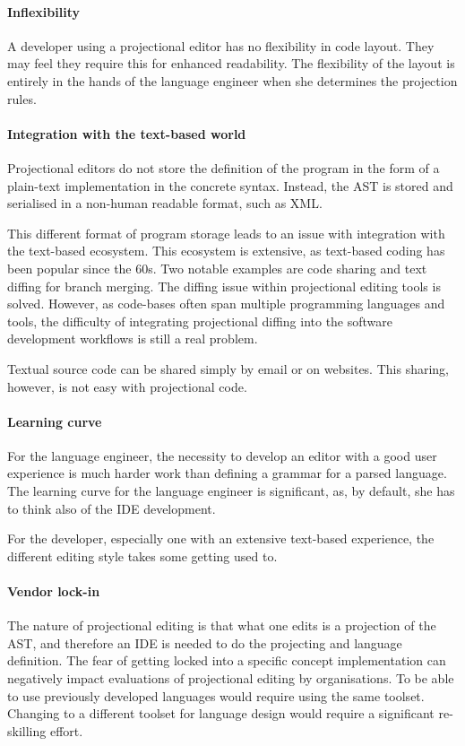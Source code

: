 \paragraph{Inflexibility} A developer using a projectional editor has no flexibility in code layout. They may feel they require this for enhanced readability.
The flexibility of the layout is entirely in the hands of the language engineer when she determines the projection rules.

\paragraph{Integration with the text-based world} Projectional editors do not store the definition of the program in the form of a plain-text implementation in the concrete syntax.
Instead, the AST is stored and serialised in a non-human readable format, such as XML.

This different format of program storage leads to an issue with integration with the text-based ecosystem.
This ecosystem is extensive, as text-based coding has been popular since the 60s.
Two notable examples are code sharing and text diffing for branch merging.
The diffing issue within projectional editing tools is solved.
However, as code-bases often span multiple programming languages and tools, the difficulty of integrating projectional diffing into the software development workflows is still a real problem.

Textual source code can be shared simply by email or on websites. 
This sharing, however, is not easy with projectional code.

\paragraph{Learning curve} For the language engineer, the necessity to develop an editor with a good user experience is much harder work than defining a grammar for a parsed language.
The learning curve for the language engineer is significant, as, by default, she has to think also of the IDE development.

For the developer, especially one with an extensive text-based experience, the different editing style takes some getting used to.

\paragraph{Vendor lock-in} The nature of projectional editing is that what one edits is a projection of the AST, and therefore an IDE is needed to do the projecting and language definition.
The fear of getting locked into a specific concept implementation can negatively impact evaluations of projectional editing by organisations.
To be able to use previously developed languages would require using the same toolset.
Changing to a different toolset for language design would require a significant re-skilling effort.
